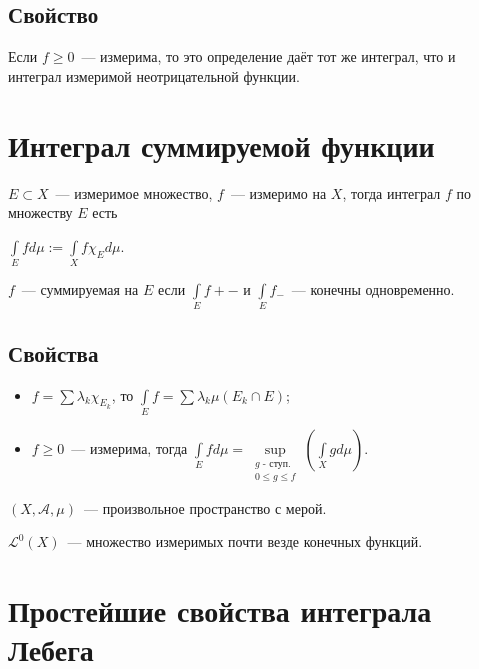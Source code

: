 \documentclass{article}
\begin{document}
        \subsection{Свойство}
                
            Если $f \geqslant 0$~--- измерима, то это определение даёт тот же интеграл, что и интеграл измеримой неотрицательной функции.
            
    \newpage
                
    \section{Интеграл суммируемой функции}
        
        $E \subset X$~--- измеримое множество, $f$~--- измеримо на $X$, тогда интеграл $f$ по множеству $E$ есть
        
        $\int\limits_{E} f d \mu := \int\limits_{X} f \chi_E d \mu$. 
        
        $f$~--- суммируемая на $E$ если $\int\limits_{E} f+-$ и $\int\limits_{E} f_-$~--- конечны одновременно.
            
        \subsection{Свойства} 
                
            \begin{itemize}
                    
                \item $f = \sum \lambda_k \chi_{E_k}$, то $\int\limits_{E} f = \sum \lambda_k \mu \left( E_k \cap E \right)$;
                
                \item $f \geqslant 0$~--- измерима, тогда $\int\limits_{E} f d \mu = \sup\limits_{\substack{\text{$g$ - ступ.} \\ 0 \leqslant g \leqslant f}} \left( \int\limits_{X} g d \mu \right)$.
                        
            \end{itemize}
                    
    \newpage
    
    $(X, \mathcal{A}, \mu)$~--- произвольное пространство с мерой.
    
    $\mathcal{L}^0 (X)$~--- множество измеримых почти везде конечных функций.
        
    \section{Простейшие свойства интеграла Лебега}
    
\end{document}
